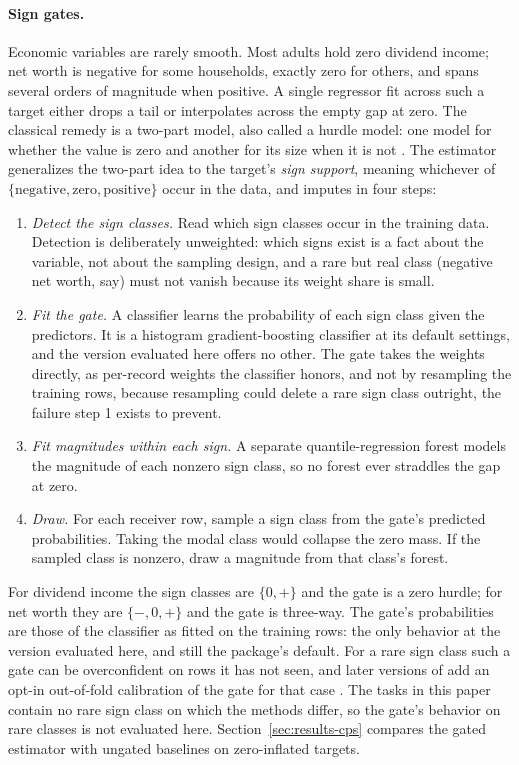 \paragraph{Sign gates.} Economic variables are rarely smooth. Most adults
hold zero dividend income; net worth is negative for some households, exactly
zero for others, and spans several orders of magnitude when positive. A
single regressor fit across such a target either drops a tail or interpolates
across the empty gap at zero. The classical remedy is a two-part model, also
called a hurdle model: one model for whether the value is zero and another
for its size when it is not
\citep{mullahy1986specification, lambert1992zero}. The estimator
generalizes the two-part idea to the target's \emph{sign support}, meaning
whichever of $\{\text{negative}, \text{zero}, \text{positive}\}$ occur in
the data, and imputes in four steps:
\begin{enumerate}
\item \emph{Detect the sign classes.} Read which sign classes occur in the
training data. Detection is deliberately unweighted: which signs
exist is a fact about the variable, not about the sampling design,
and a rare but real class (negative net worth, say) must not vanish because
its weight share is small.
\item \emph{Fit the gate.} A classifier learns the probability of each sign
class given the predictors. It is a histogram gradient-boosting classifier
\citep{pedregosa2011scikit} at its default settings, and the version
evaluated here offers no other. The gate takes the weights directly, as
per-record weights the classifier honors, and not by resampling the training
rows, because resampling could delete a rare sign class outright, the
failure step 1 exists to prevent.
\item \emph{Fit magnitudes within each sign.} A separate quantile-regression
forest models the magnitude of each nonzero sign class, so no forest ever
straddles the gap at zero.
\item \emph{Draw.} For each receiver row, sample a sign class from the
gate's predicted probabilities. Taking the modal class would collapse the
zero mass. If the sampled class is nonzero, draw a magnitude from that
class's forest.
\end{enumerate}
For dividend income the sign classes are $\{0, +\}$ and the gate is a zero
hurdle; for net worth they are $\{-, 0, +\}$ and the gate is three-way.
The gate's probabilities are those of the classifier as fitted on the
training rows: the only behavior at the version evaluated here, and still
the package's default. For a rare sign class such a gate can be
overconfident on rows it has not seen, and later versions of \populacefit{}
add an opt-in out-of-fold calibration of the gate for that case
\citep{microcosm2026}. The tasks in this paper contain no rare sign class on
which the methods differ, so the gate's behavior on rare classes is not
evaluated here.
Section~\ref{sec:results-cps} compares the gated estimator with ungated
baselines on zero-inflated targets.

